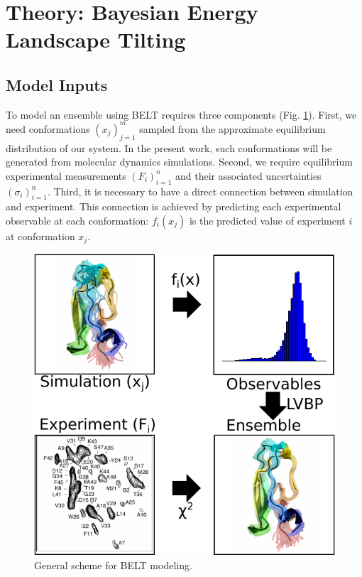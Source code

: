 \documentclass[journal=jacsat,manuscript=article]{achemso}
\begin{document}
\section{Theory: Bayesian Energy Landscape Tilting}

\subsection{Model Inputs}

To model an ensemble using BELT requires three components (Fig. \ref{figure:BELT}).  First, we need conformations $(x_j)_{j=1}^{m}$ sampled from the approximate equilibrium distribution of our system.  In the present work, such conformations will be generated from molecular dynamics simulations.  Second, we require equilibrium experimental measurements $(F_i)_{i=1}^n$ and their associated uncertainties $(\sigma_i)_{i=1}^{n}$.  Third, it is necessary to have a direct connection between simulation and experiment.  This connection is achieved by predicting each experimental observable at each conformation: $f_i(x_j)$ is the predicted value of experiment $i$ at conformation $x_j$.  

\begin{figure}

\includegraphics[width=18.0cm]{figures/info_graphic/info_graphic.pdf}

\caption{
General scheme for BELT modeling.
}
\label{figure:BELT}
\end{figure}
\end{document}
